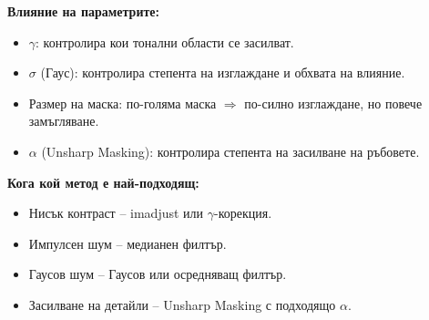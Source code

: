 \textbf{Влияние на параметрите:}
\begin{itemize}
    \item $\gamma$: контролира кои тонални области се засилват.
    \item $\sigma$ (Гаус): контролира степента на изглаждане и обхвата на влияние.
    \item Размер на маска: по-голяма маска $\Rightarrow$ по-силно изглаждане, но повече замъгляване.
    \item $\alpha$ (Unsharp Masking): контролира степента на засилване на ръбовете.
\end{itemize}

\textbf{Кога кой метод е най-подходящ:}
\begin{itemize}
    \item Нисък контраст – imadjust или $\gamma$-корекция.
    \item Импулсен шум – медианен филтър.
    \item Гаусов шум – Гаусов или осредняващ филтър.
    \item Засилване на детайли – Unsharp Masking с подходящо $\alpha$.
\end{itemize}
